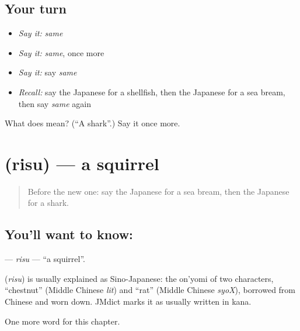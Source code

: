 \subsection*{Your turn}
\begin{itemize}
\raggedright
  \item \emph{Say it:} \emph{same}
  \item \emph{Say it:} \emph{same}, once more
  \item \emph{Say it:} say \emph{same}
  \item \emph{Recall:} say the Japanese for a shellfish, then the Japanese for a sea bream, then say \emph{same} again
\end{itemize}

\begin{tcolorbox}[breakable,colback=teal!4,colframe=teal!35!black,title={Before you move on}]
What does  mean? (\textquotedblleft{}A shark\textquotedblright{}.) Say it once more.
\end{tcolorbox}
\section[\texorpdfstring{\ja{りす} (risu)}{りす (risu)}]{ (risu) — a squirrel}

\label{lesson:JA-C108-risu}



\begin{quote}
Before the new one: say the Japanese for a sea bream, then the Japanese for a shark.
\end{quote}

\subsection*{You'll want to know: }
\textbf{} — \emph{risu} — \textquotedblleft{}a squirrel\textquotedblright{}.

\begin{cousinweb}
\textbf{} (\emph{risu}) is usually explained as Sino-Japanese: the on'yomi of two characters, \textquotedblleft{}chestnut\textquotedblright{} (Middle Chinese \emph{lit}) and \textquotedblleft{}rat\textquotedblright{} (Middle Chinese \emph{syoX}), borrowed from Chinese and worn down. JMdict marks it as usually written in kana.
\end{cousinweb}

\begin{grammarlens}[title={What you've built}]
One more word for this chapter.
\end{grammarlens}

